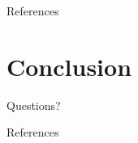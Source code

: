 \documentclass[10pt]{beamer}
\begin{document}
\begin{frame}{References}
  \cite{ndugga_2017, smith_2018}
\end{frame}

\section{Conclusion}

{
\begin{frame}[standout]
  Questions?
\end{frame}
}

\appendix


\begin{frame}[allowframebreaks]{References}

  
  

\end{frame}
\end{document}

